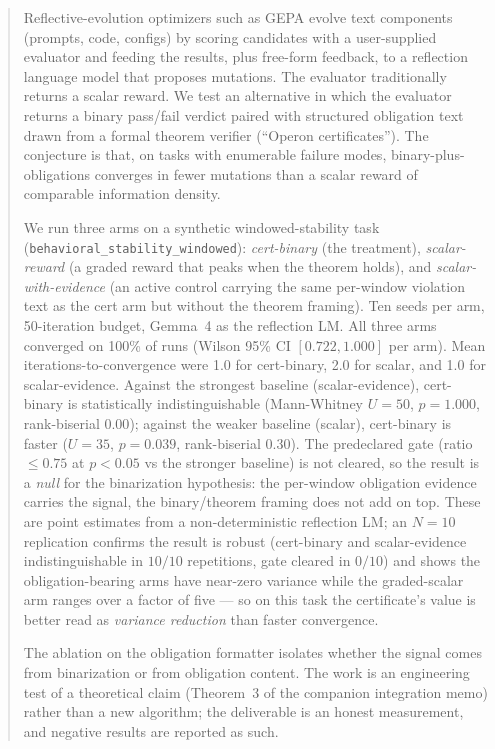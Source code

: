 \begin{abstract}
Reflective-evolution optimizers such as GEPA evolve text components
(prompts, code, configs) by scoring candidates with a user-supplied
evaluator and feeding the results, plus free-form feedback, to a
reflection language model that proposes mutations.  The evaluator
traditionally returns a scalar reward.  We test an alternative in
which the evaluator returns a binary pass/fail verdict paired with
structured obligation text drawn from a formal theorem verifier
(``Operon certificates'').  The conjecture is that, on tasks with
enumerable failure modes, binary-plus-obligations converges in fewer
mutations than a scalar reward of comparable information density.

We run three arms on a synthetic windowed-stability task
(\texttt{behavioral\_stability\_windowed}): \emph{cert-binary} (the
treatment), \emph{scalar-reward} (a graded reward that peaks when the
theorem holds), and \emph{scalar-with-evidence} (an active control
carrying the same per-window violation text as the cert arm but
without the theorem framing).  Ten seeds per arm, 50-iteration
budget, Gemma~4 as the reflection LM.  All three arms converged on
100\% of runs (Wilson 95\% CI $[0.722, 1.000]$ per arm).  Mean
iterations-to-convergence were 1.0 for cert-binary, 2.0 for
scalar, and 1.0 for scalar-evidence.  Against the strongest
baseline (scalar-evidence), cert-binary is statistically
indistinguishable (Mann-Whitney $U=50$, $p=1.000$, rank-biserial
$0.00$); against the weaker baseline (scalar), cert-binary is
faster ($U=35$, $p=0.039$, rank-biserial $0.30$).  The predeclared
gate (ratio $\le 0.75$ at $p<0.05$ vs the stronger baseline) is
not cleared, so the result is a \emph{null} for the binarization
hypothesis: the per-window obligation evidence carries the signal,
the binary/theorem framing does not add on top.  These are point
estimates from a non-deterministic reflection LM; an $N=10$
replication confirms the result is robust (cert-binary and
scalar-evidence indistinguishable in $10/10$ repetitions, gate
cleared in $0/10$) and shows the obligation-bearing arms have
near-zero variance while the graded-scalar arm ranges over a factor
of five --- so on this task the certificate's value is better read as
\emph{variance reduction} than faster convergence.

The ablation on the obligation formatter isolates whether
the signal comes from binarization or from obligation content.  The
work is an engineering test of a theoretical claim (Theorem~3 of the
companion integration memo) rather than a new algorithm; the
deliverable is an honest measurement, and negative results are
reported as such.
\end{abstract}
